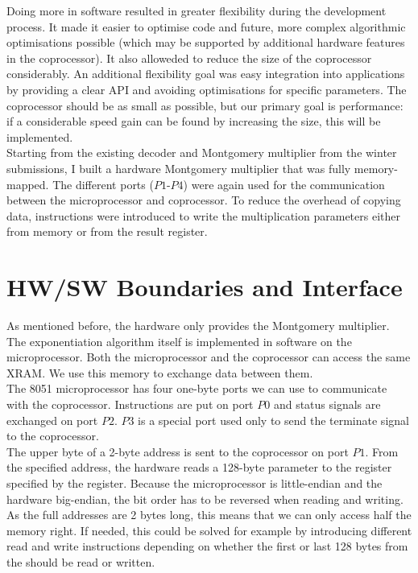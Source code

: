 \documentclass[a4paper]{article}
\begin{document}
Doing more in software resulted in greater flexibility during the development process. It made it easier to optimise  code and  future, more complex algorithmic optimisations possible (which may be supported by additional hardware features in the coprocessor). It also alloweded to reduce the size of the coprocessor considerably. An additional flexibility goal was easy integration into applications by providing a clear API and avoiding optimisations for specific parameters. The coprocessor should be as small as possible, but our primary goal is performance: if a considerable speed gain can be found by increasing the size, this will be implemented.\\

Starting from the existing decoder and Montgomery multiplier from the winter submissions, I built a hardware Montgomery multiplier that was fully memory-mapped. The different ports ($P1$-$P4$) were again used for the communication between the microprocessor and coprocessor. To reduce the overhead of copying data, instructions were introduced to write the multiplication parameters either from memory or from the result register.

\section{HW/SW Boundaries and Interface}
\label{sec:hwsw_boundaries_and_interface}

As mentioned before, the hardware only provides the Montgomery multiplier. The exponentiation algorithm itself is implemented in software on the microprocessor. Both the microprocessor and the coprocessor can access the same XRAM. We use this memory to exchange data between them.\\

The 8051 microprocessor has four one-byte ports we can use to communicate with the coprocessor. Instructions are put on port $P0$ and status signals are exchanged on port $P2$. $P3$ is a special port used only to send the terminate signal to the coprocessor.\\

The upper byte of a 2-byte address is sent to the coprocessor on port $P1$. From the specified address, the hardware reads a 128-byte parameter to the register specified by the register. Because the microprocessor is little-endian and the hardware big-endian, the bit order has to be reversed when reading and writing. As the full addresses are 2 bytes long, this means that we can only access half the memory right. If needed, this could be solved for example by introducing different read and write instructions depending on whether the first or last 128 bytes from the should be read or written.
\end{document}
